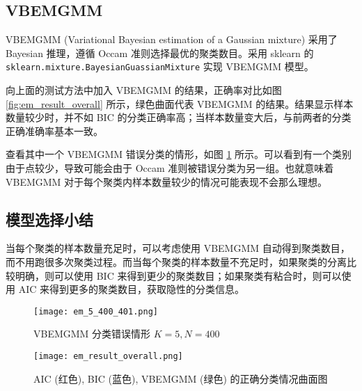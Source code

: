     \subsection{VBEMGMM}

    VBEMGMM (Variational Bayesian estimation of a Gaussian mixture) 采用了 Bayesian 推理，遵循 Occam 准则选择最优的聚类数目。采用 sklearn 的 \verb"sklearn.mixture.BayesianGuassianMixture" 实现 VBEMGMM 模型\cite{skvbgmm}。

    向上面的测试方法中加入 VBEMGMM 的结果，正确率对比如图 \ref{fig:em_result_overall} 所示，绿色曲面代表 VBEMGMM 的结果。结果显示样本数量较少时，并不如 BIC 的分类正确率高；当样本数量变大后，与前两者的分类正确准确率基本一致。

    查看其中一个 VBEMGMM 错误分类的情形，如图 \ref{fig:vbemgmm} 所示。可以看到有一个类别由于点较少，导致可能会由于 Occam 准则被错误分类为另一组。也就意味着 VBEMGMM 对于每个聚类内样本数量较少的情况可能表现不会那么理想。

    \subsection{模型选择小结}

    当每个聚类的样本数量充足时，可以考虑使用 VBEMGMM 自动得到聚类数目，而不用跑很多次聚类过程。而当每个聚类的样本数量不充足时，如果聚类的分离比较明确，则可以使用 BIC 来得到更少的聚类数目；如果聚类有粘合时，则可以使用 AIC 来得到更多的聚类数目，获取隐性的分类信息。

    \begin{figure}
        \centering
        \texttt{[image: em\_5\_400\_401.png]}
        \caption{VBEMGMM 分类错误情形 $K=5,N=400$}\label{fig:vbemgmm}
    \end{figure}

    \begin{figure}
        \begin{minipage}[b]{.5\linewidth}
            \centering
            \texttt{[image: em\_result\_overall.png]}
            \caption{AIC (红色), BIC (蓝色), VBEMGMM (绿色) 的正确分类情况曲面图}\label{fig:em_result_overall}
        \end{minipage}
        \begin{minipage}[b]{.5\linewidth}
            \centering
            \label{tab:em_result}
        \end{minipage}
    \end{figure}

    \clearpage

    
